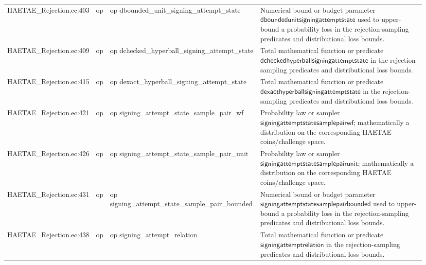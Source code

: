 \documentclass[10pt]{article}
\begin{document}
\begin{longtable}{L{0.11\textwidth}L{0.055\textwidth}L{0.385\textwidth}L{0.41\textwidth}}
HAETAE\_\allowbreak{}Rejection.\allowbreak{}ec:\allowbreak{}403 & op & {\ttfamily\scriptsize op dbounded\_\allowbreak{}unit\_\allowbreak{}signing\_\allowbreak{}attempt\_\allowbreak{}state} & Numerical bound or budget parameter $\mathsf{dboundedunitsigningattemptstate}$ used to upper-bound a probability loss in the rejection-sampling predicates and distributional loss bounds. \\
HAETAE\_\allowbreak{}Rejection.\allowbreak{}ec:\allowbreak{}409 & op & {\ttfamily\scriptsize op dchecked\_\allowbreak{}hyperball\_\allowbreak{}signing\_\allowbreak{}attempt\_\allowbreak{}state} & Total mathematical function or predicate $\mathsf{dcheckedhyperballsigningattemptstate}$ in the rejection-sampling predicates and distributional loss bounds. \\
HAETAE\_\allowbreak{}Rejection.\allowbreak{}ec:\allowbreak{}415 & op & {\ttfamily\scriptsize op dexact\_\allowbreak{}hyperball\_\allowbreak{}signing\_\allowbreak{}attempt\_\allowbreak{}state} & Total mathematical function or predicate $\mathsf{dexacthyperballsigningattemptstate}$ in the rejection-sampling predicates and distributional loss bounds. \\
HAETAE\_\allowbreak{}Rejection.\allowbreak{}ec:\allowbreak{}421 & op & {\ttfamily\scriptsize op signing\_\allowbreak{}attempt\_\allowbreak{}state\_\allowbreak{}sample\_\allowbreak{}pair\_\allowbreak{}wf} & Probability law or sampler $\mathsf{signingattemptstatesamplepairwf}$; mathematically a distribution on the corresponding HAETAE coins/challenge space. \\
HAETAE\_\allowbreak{}Rejection.\allowbreak{}ec:\allowbreak{}426 & op & {\ttfamily\scriptsize op signing\_\allowbreak{}attempt\_\allowbreak{}state\_\allowbreak{}sample\_\allowbreak{}pair\_\allowbreak{}unit} & Probability law or sampler $\mathsf{signingattemptstatesamplepairunit}$; mathematically a distribution on the corresponding HAETAE coins/challenge space. \\
HAETAE\_\allowbreak{}Rejection.\allowbreak{}ec:\allowbreak{}431 & op & {\ttfamily\scriptsize op signing\_\allowbreak{}attempt\_\allowbreak{}state\_\allowbreak{}sample\_\allowbreak{}pair\_\allowbreak{}bounded} & Numerical bound or budget parameter $\mathsf{signingattemptstatesamplepairbounded}$ used to upper-bound a probability loss in the rejection-sampling predicates and distributional loss bounds. \\
HAETAE\_\allowbreak{}Rejection.\allowbreak{}ec:\allowbreak{}438 & op & {\ttfamily\scriptsize op signing\_\allowbreak{}attempt\_\allowbreak{}relation} & Total mathematical function or predicate $\mathsf{signingattemptrelation}$ in the rejection-sampling predicates and distributional loss bounds. \\

\end{longtable}
\end{document}
